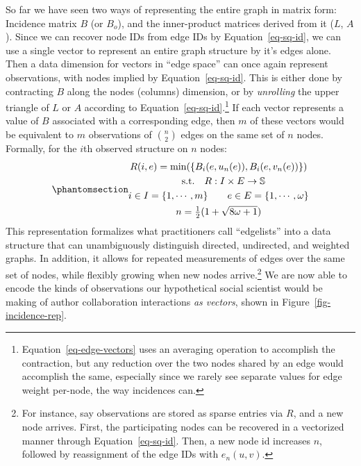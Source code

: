 \documentclass[%
	12pt,
		oneside,
		letterpaper
]{book}
\begin{document}
So far we have seen two ways of representing the entire graph in matrix
form: Incidence matrix \(B\) (or \(B_o\)), and the inner-product
matrices derived from it (\(L\), \(A\)). Since we can recover node IDs
from edge IDs by Equation~\ref{eq-sq-id}, we can use a single vector to
represent an entire graph structure by it's edges alone. Then a data
dimension for vectors in ``edge space'' can once again represent
observations, with nodes implied by Equation~\ref{eq-sq-id}. This is
either done by contracting \(B\) along the nodes (columns) dimension, or
by \emph{unrolling} the upper triangle of \(L\) or \(A\) according to
Equation~\ref{eq-sq-id}.\footnote{ Equation~\ref{eq-edge-vectors} uses
  an averaging operation to accomplish the contraction, but any
  reduction over the two nodes shared by an edge would accomplish the
  same, especially since we rarely see separate values for edge weight
  per-node, the way incidences can.} If each vector represents a value
of \(B\) associated with a corresponding edge, then \(m\) of these
vectors would be equivalent to \(m\) observations of \({n \choose 2}\)
edges on the same set of \(n\) nodes. Formally, for the \(i\)th observed
structure on \(n\) nodes:
\begin{equation}\phantomsection\label{eq-edge-vectors}{
\begin{gathered}
R(i,e) = \min(\{B_i(e, u_n(e)),B_i(e,v_n(e))\}) \\
\quad \textrm{s.t.} \quad R:I\times E \rightarrow \mathbb{S}\\
i\in I = \{1,\cdots,m\} \qquad e \in E=\left\{1,\cdots,\omega\right\}\\
n=\tfrac{1}{2}(1+\sqrt{8\omega+1})
\end{gathered}
}\end{equation} This representation formalizes what practitioners call
``edgelists'' into a data structure that can unambiguously distinguish
directed, undirected, and weighted graphs. In addition, it allows for
repeated measurements of edges over the same set of nodes, while
flexibly growing when new nodes arrive.\footnote{ For instance, say
  observations are stored as sparse entries via \(R\), and a new node
  arrives. First, the participating nodes can be recovered in a
  vectorized manner through Equation~\ref{eq-sq-id}. Then, a new node id
  increases \(n\), followed by reassignment of the edge IDs with
  \(e_n(u,v)\).} We are now able to encode the kinds of observations our
hypothetical social scientist would be making of author collaboration
interactions \emph{as vectors}, shown in Figure~\ref{fig-incidence-rep}.
\end{document}
